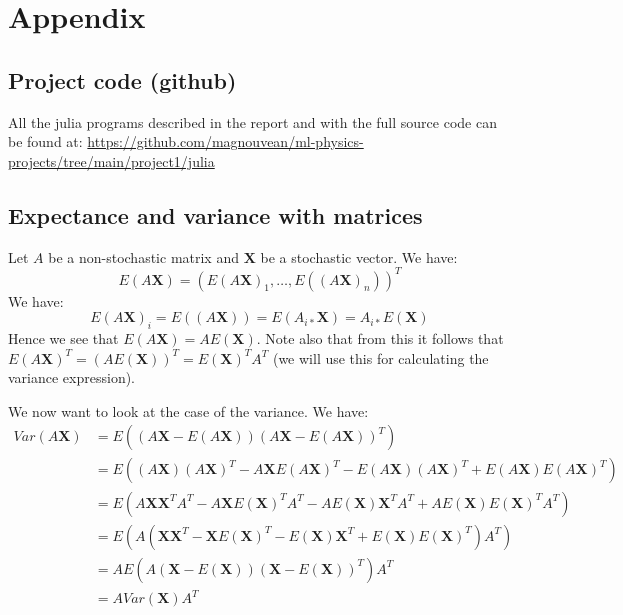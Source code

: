 \documentclass{article}
\begin{document}
\section{Appendix}

\subsection{Project code (github)}
All the julia programs described in the report and with the full source code can be
found at:
\url{https://github.com/magnouvean/ml-physics-projects/tree/main/project1/julia}

\subsection{Expectance and variance with matrices}
Let $A$ be a non-stochastic matrix and $\mathbf{X}$ be a stochastic vector. We have:
$$E(A \mathbf{X}) = (E(A \mathbf{X})_1, \dots, E((A \mathbf{X})_n))^T$$
We have:
$$E(A \mathbf{X})_i = E((A \mathbf{X})) = E(A_{i *} \mathbf{X}) = A_{i *} E(\mathbf{X})$$
Hence we see that $E(A \mathbf{X}) = A E(\mathbf{X})$.
Note also that from this it follows that $E(A \mathbf{X})^T = (A
    E(\mathbf{X}))^T = E(\mathbf{X})^T A^T$ (we will use this for calculating the
variance expression).

We now want to look at the case of the variance. We have:
\begin{align*}
    Var(A \mathbf{X}) & = E((A \mathbf{X} - E(A \mathbf{X})) (A \mathbf{X} - E(A \mathbf{X}))^T)                                                                       \\
                      & = E((A \mathbf{X})(A \mathbf{X})^T  - A \mathbf{X} E(A \mathbf{X})^T - E(A \mathbf{X}) (A \mathbf{X})^T + E(A \mathbf{X}) E(A \mathbf{X})^T)   \\
                      & = E(A \mathbf{X}\mathbf{X}^T A^T  - A \mathbf{X} E(\mathbf{X})^T A^T - A E(\mathbf{X}) \mathbf{X}^T A^T + A E(\mathbf{X}) E(\mathbf{X})^T A^T) \\
                      & = E(A (\mathbf{X}\mathbf{X}^T  - \mathbf{X} E(\mathbf{X})^T - E(\mathbf{X}) \mathbf{X}^T + E(\mathbf{X}) E(\mathbf{X})^T ) A^T)                \\
                      & = A E(A (\mathbf{X} - E(\mathbf{X})) (\mathbf{X} - E(\mathbf{X}))^T) A^T                                                                       \\
                      & = A Var(\mathbf{X}) A^T                                                                                                                        \\
\end{align*}



\end{document}
